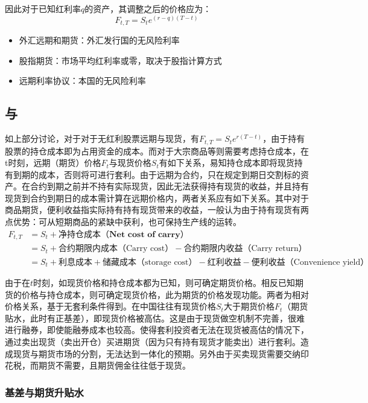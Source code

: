 \documentclass[11pt]{article}
\begin{document}
因此对于已知红利率$q$的资产，其调整之后的价格应为：
\begin{equation*}
    F_{t,T} = S_t e^{(r-q)(T-t)}
\end{equation*}

\begin{itemize}
    \item 外汇远期和期货：外汇发行国的无风险利率
    \item 股指期货：市场平均红利率或零，取决于股指计算方式
    \item 远期利率协议：本国的无风险利率
\end{itemize}

\subsection{与}

如上部分讨论，对于对于无红利股票远期与现货，有$F_{t,T} = S_t e^{r(T-t)}$，由于持有股票的持仓成本即为占用资金的成本。而对于大宗商品等则需要考虑持仓成本，在t时刻，远期（期货）价格$F_t$与现货价格$S_t$有如下关系，易知持仓成本即将现货持有到期的成本，否则将可进行套利。由于远期为合约，只在规定到期日交割标的资产。在合约到期之前并不持有实际现货，因此无法获得持有现货的收益，并且持有现货到合约到期日的成本需计算在远期价格内，两者关系应有如下关系。其中对于商品期货，便利收益指实际持有持有现货带来的收益，一般认为由于持有现货有两点优势：可从短期商品的紧缺中获利，也可保持生产线的运转。
\begin{align*}
    F_{t,T} &= S_t + \textbf{净持仓成本（Net cost of carry）} \\
    &= S_t + \text{合约期限内成本（Carry cost）} - \text{合约期限内收益（Carry return）} \\
    &= S_t + \text{利息成本} + \text{储藏成本（storage cost）} - \text{红利收益} - \text{便利收益（Convenience yield）}
\end{align*}

由于在$t$时刻，如现货价格和持仓成本都为已知，则可确定期货价格。相反已知期货的价格与持仓成本，则可确定现货价格，此为期货的价格发现功能。两者为相对价格关系，基于无套利条件得到。在中国往往有现货价格$S_t$大于期货价格$F_t$（期货贴水，此时有正基差），即现货价格被高估。这是由于现货做空机制不完善，很难进行融券，即使能融券成本也较高。使得套利投资者无法在现货被高估的情况下，通过卖出现货（卖出开仓）买进期货（因为只有持有现货才能卖出）进行套利。造成现货与期货市场的分割，无法达到一体化的预期。另外由于买卖现货需要交纳印花税，而期货不需要，且期货佣金往往低于现货。

\subsubsection*{基差与期货升贴水}
\end{document}
